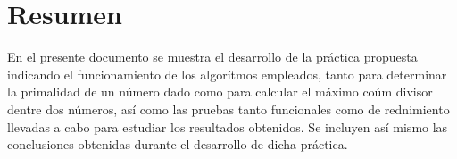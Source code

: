 \part{Resumen}
En el presente documento se muestra el desarrollo de la práctica propuesta indicando el funcionamiento de los algorítmos empleados, tanto para determinar la primalidad de un número dado como para calcular el máximo coúm divisor dentre dos números, así como las pruebas tanto funcionales como de rednimiento llevadas a cabo para estudiar los resultados obtenidos. 
Se incluyen así mismo las conclusiones obtenidas durante el desarrollo de dicha práctica.

\newpage
